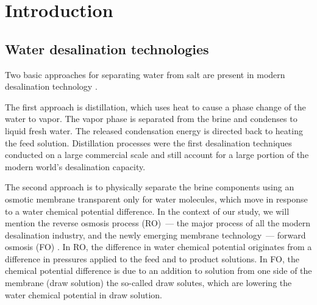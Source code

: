\documentclass[journal,article,submit,pdftex,moreauthors]{Definitions/mdpi}
\begin{document}




\section{Introduction\label{sec: intro}}
\subsection{Water desalination technologies}


Two basic approaches for separating water from salt are present in modern desalination technology \cite{Miller2003,Curto2021}.

The first approach is distillation, which uses heat to cause a phase change of the water to vapor. The vapor phase is separated from the brine and condenses to liquid fresh water. 
The released condensation energy is directed back to heating the feed solution.
Distillation processes were the first desalination techniques conducted on a large commercial scale and still account for a large portion of the modern world’s desalination capacity.

The second approach is to physically separate the brine components using an osmotic membrane transparent only for water molecules, which move in response to a water chemical potential difference.
In the context of our study, we will mention the reverse osmosis process (RO)~--- the major process of all the modern desalination industry, and the newly emerging membrane
technology~--- forward osmosis (FO) \cite{Akther2015}. 
In RO, the difference in water chemical potential originates from a difference in pressures applied to the feed and to product solutions. 
In FO, the chemical potential difference is due to an addition to solution from one side of the membrane (draw solution) the so-called draw solutes, which are lowering the water chemical potential in draw solution.
\end{document}
